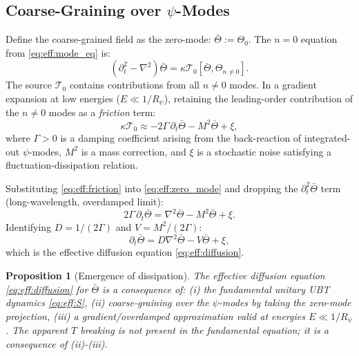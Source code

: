 \documentclass[12pt,a4paper]{article}
\newtheorem{proposition}[theorem]{Proposition}
\theoremstyle{definition}
\theoremstyle{remark}
\begin{document}
\subsection{Coarse-Graining over $\psi$-Modes}

Define the coarse-grained field as the zero-mode:
$\bar\Theta := \Theta_0$.  The $n=0$ equation from \eqref{eq:eff:mode_eq} is:
\begin{equation}
  (\partial_t^2 - \nabla^2)\bar\Theta = \kappa\mathcal{T}_0[\bar\Theta, \Theta_{n\neq0}].
  \label{eq:eff:zero_mode}
\end{equation}
The source $\mathcal{T}_0$ contains contributions from all $n\neq0$ modes.
In a gradient expansion at low energies ($E\ll 1/R_\psi$), retaining the
leading-order contribution of the $n\neq0$ modes as a \emph{friction} term:
\begin{equation}
  \kappa\mathcal{T}_0 \approx -2\Gamma\,\partial_t\bar\Theta - M^2\bar\Theta + \xi,
  \label{eq:eff:friction}
\end{equation}
where $\Gamma > 0$ is a damping coefficient arising from the back-reaction
of integrated-out $\psi$-modes, $M^2$ is a mass correction, and $\xi$ is
a stochastic noise satisfying a fluctuation-dissipation relation.

Substituting \eqref{eq:eff:friction} into \eqref{eq:eff:zero_mode} and
dropping the $\partial_t^2\bar\Theta$ term (long-wavelength, overdamped limit):
\begin{equation}
  2\Gamma\,\partial_t\bar\Theta
  = \nabla^2\bar\Theta - M^2\bar\Theta + \xi.
  \label{eq:eff:overdamped}
\end{equation}
Identifying $D = 1/(2\Gamma)$ and $V = M^2/(2\Gamma)$:
\begin{equation}
  \partial_t\bar\Theta = D\nabla^2\bar\Theta - V\bar\Theta + \xi,
\end{equation}
which is the effective diffusion equation \eqref{eq:eff:diffusion}.

\begin{proposition}[Emergence of dissipation]
\label{prop:eff:emergence}
The effective diffusion equation \eqref{eq:eff:diffusion} for $\bar\Theta$
is a consequence of:
(i) the fundamental unitary UBT dynamics \eqref{eq:eff:S},
(ii) coarse-graining over the $\psi$-modes by taking the zero-mode projection,
(iii) a gradient/overdamped approximation valid at energies $E\ll 1/R_\psi$.
The apparent $T$ breaking is not present in the fundamental equation;
it is a consequence of (ii)-(iii).
\end{proposition}
\end{document}
